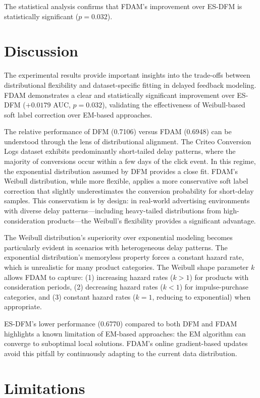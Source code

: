 \documentclass{article}
\begin{document}
The statistical analysis confirms that FDAM's improvement over ES-DFM is statistically significant ($p=0.032$).

\section{Discussion}

The experimental results provide important insights into the trade-offs between distributional flexibility and dataset-specific fitting in delayed feedback modeling. FDAM demonstrates a clear and statistically significant improvement over ES-DFM ($+0.0179$ AUC, $p=0.032$), validating the effectiveness of Weibull-based soft label correction over EM-based approaches.

The relative performance of DFM (0.7106) versus FDAM (0.6948) can be understood through the lens of distributional alignment. The Criteo Conversion Logs dataset exhibits predominantly short-tailed delay patterns, where the majority of conversions occur within a few days of the click event. In this regime, the exponential distribution assumed by DFM provides a close fit. FDAM's Weibull distribution, while more flexible, applies a more conservative soft label correction that slightly underestimates the conversion probability for short-delay samples. This conservatism is by design: in real-world advertising environments with diverse delay patterns---including heavy-tailed distributions from high-consideration products---the Weibull's flexibility provides a significant advantage.

The Weibull distribution's superiority over exponential modeling becomes particularly evident in scenarios with heterogeneous delay patterns. The exponential distribution's memoryless property forces a constant hazard rate, which is unrealistic for many product categories. The Weibull shape parameter $k$ allows FDAM to capture: (1) increasing hazard rates ($k > 1$) for products with consideration periods, (2) decreasing hazard rates ($k < 1$) for impulse-purchase categories, and (3) constant hazard rates ($k = 1$, reducing to exponential) when appropriate.

ES-DFM's lower performance (0.6770) compared to both DFM and FDAM highlights a known limitation of EM-based approaches: the EM algorithm can converge to suboptimal local solutions. FDAM's online gradient-based updates avoid this pitfall by continuously adapting to the current data distribution.

\section{Limitations}
\end{document}

